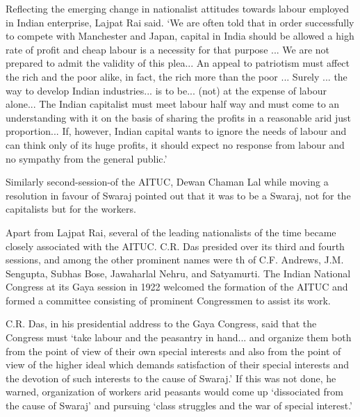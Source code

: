 Reflecting the emerging change in nationalist attitudes towards labour employed in Indian enterprise, Lajpat Rai said. `We are often told that in order successfully to compete with Manchester and Japan, capital in India should be allowed a high rate of profit and cheap labour is a necessity for that purpose ... We are not prepared to admit the validity of this plea... An appeal to patriotism must affect the rich and the poor alike, in fact, the rich more than the poor ... Surely ... the way to develop Indian industries... is to be... (not) at the expense of labour alone... The Indian capitalist must meet labour half way and must come to an understanding with it on the basis of sharing the profits in a reasonable arid just proportion... If, however, Indian capital wants to ignore the needs of labour and can think only of its huge profits, it should expect no response from labour and no sympathy from the general public.'

Similarly second-session-of the AITUC, Dewan Chaman Lal while moving a resolution in favour of Swaraj pointed out that it was to be a Swaraj, not for the capitalists but for the workers.

Apart from Lajpat Rai, several of the leading nationalists of the time became closely associated with the AITUC. C.R. Das presided over its third and fourth sessions, and among the other prominent names were th of C.F. Andrews, J.M. Sengupta, Subhas Bose, Jawaharlal Nehru, and Satyamurti. The Indian National Congress at its Gaya session in 1922 welcomed the formation of the AITUC and formed a committee consisting of prominent Congressmen to assist its work.

C.R. Das, in his presidential address to the Gaya Congress, said that the Congress must `take labour and the peasantry in hand... and organize them both from the point of view of their own special interests and also from the point of view of the higher ideal which demands satisfaction of their special interests and the devotion of such interests to the cause of Swaraj.' If this was not done, he warned, organization of workers arid peasants would come up `dissociated from the cause of Swaraj' and pursuing `class struggles and the war of special interest.'

